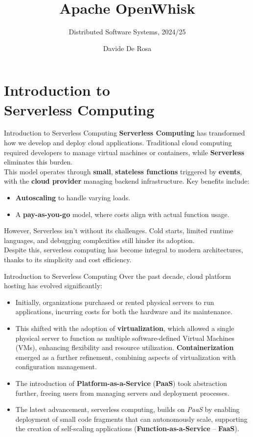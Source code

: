 \documentclass[aspectratio=169]{beamer}
\title{Apache OpenWhisk}
\subtitle{Distributed Software Systems, 2024/25}
\author{Davide De Rosa}
\date{}
\begin{document}
\begin{frame}[plain]
    \titlepage
\end{frame}

\section{Introduction to \\Serverless Computing}
\begin{frame}{Introduction to Serverless Computing}
\textbf{Serverless Computing} has transformed how we develop and deploy cloud applications. Traditional cloud computing required developers to manage virtual machines or containers, while \textbf{Serverless} eliminates this burden.\\
This model operates through \textbf{small}, \textbf{stateless functions} triggered by \textbf{events}, with the \textbf{cloud provider} managing backend infrastructure. Key benefits include:
\begin{itemize}
    \item \textbf{Autoscaling} to handle varying loads.
    \item A \textbf{pay-as-you-go} model, where costs align with actual function usage.
\end{itemize}
However, Serverless isn’t without its challenges. Cold starts, limited runtime languages, and debugging complexities still hinder its adoption.\\
Despite this, serverless computing has become integral to modern architectures, thanks to its simplicity and cost efficiency.
\end{frame}

\begin{frame}{Introduction to Serverless Computing}
Over the past decade, cloud platform hosting has evolved significantly:
\begin{itemize}
    \item Initially, organizations purchased or rented physical servers to run applications, incurring costs for both the hardware and its maintenance.
    \item This shifted with the adoption of \textbf{virtualization}, which allowed a single physical server to function as multiple software-defined Virtual Machines (VMs), enhancing flexibility and resource utilization. \textbf{Containerization} emerged as a further refinement, combining aspects of virtualization with configuration management.
    \item The introduction of \textbf{Platform-as-a-Service} (\textbf{PaaS}) took abstraction further, freeing users from managing servers and deployment processes.
    \item The latest advancement, serverless computing, builds on \textit{PaaS} by enabling deployment of small code fragments that can autonomously scale, supporting the creation of self-scaling applications (\textbf{Function-as-a-Service} -- \textbf{FaaS}).
\end{itemize}
\end{frame}
\end{document}
